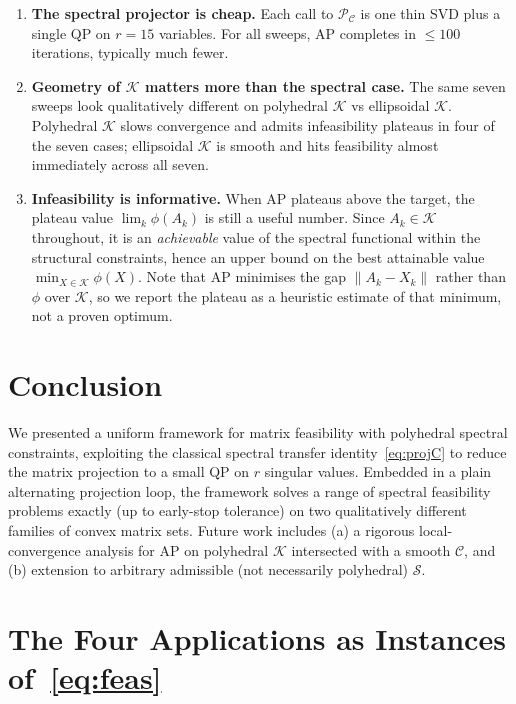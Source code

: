 \documentclass[journal]{IEEEtran}
\newcommand{\proj}{\mathcal{P}}
\newcommand{\spec}{\mathcal{S}}
\newcommand{\Kset}{\mathcal{K}}
\newcommand{\Cset}{\mathcal{C}}
\begin{document}
\begin{enumerate}
\item[(O1)] \textbf{The spectral projector is cheap.}
Each call to $\proj_\Cset$ is one thin SVD plus a single QP on $r=15$
variables. For all sweeps, AP completes in $\le 100$ iterations,
typically much fewer.

\item[(O2)] \textbf{Geometry of $\Kset$ matters more than the spectral
case.}
The same seven sweeps look qualitatively different on polyhedral
$\Kset$ vs ellipsoidal $\Kset$. Polyhedral $\Kset$ slows convergence
and admits infeasibility plateaus in four of the seven cases;
ellipsoidal $\Kset$ is smooth and hits feasibility almost immediately
across all seven.

\item[(O3)] \textbf{Infeasibility is informative.}
When AP plateaus above the target, the plateau value
$\lim_k \phi(A_k)$ is still a useful number. Since $A_k \in \Kset$
throughout, it is an \emph{achievable} value of the spectral functional
within the structural constraints, hence an upper bound on the best
attainable value $\min_{X\in\Kset}\phi(X)$. Note that AP minimises the
gap $\|A_k - X_k\|$ rather than $\phi$ over $\Kset$, so we report the
plateau as a heuristic estimate of that minimum, not a proven optimum.
\end{enumerate}

\section{Conclusion}\label{sec:conc}

We presented a uniform framework for matrix feasibility with polyhedral
spectral constraints, exploiting the classical spectral transfer
identity~\eqref{eq:projC} to reduce the matrix projection to a small QP
on $r$ singular values. Embedded in a plain alternating projection
loop, the framework solves a range of spectral feasibility problems
exactly (up to early-stop tolerance) on two qualitatively different
families of convex matrix sets. Future work includes
(a) a rigorous local-convergence analysis for AP on polyhedral $\Kset$
intersected with a smooth $\Cset$, and (b) extension to arbitrary
admissible (not necessarily polyhedral) $\spec$.

\appendices

\section{The Four Applications as Instances of~\eqref{eq:feas}}
\label{app:apps}
\end{document}
